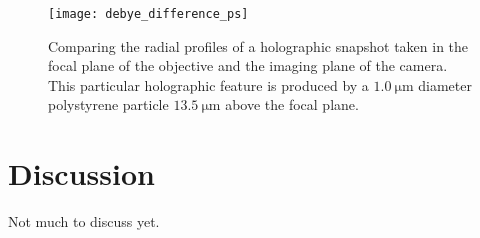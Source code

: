 \begin{figure}
  \centering
  \texttt{[image: debye\_difference\_ps]}
  \caption{Comparing the radial profiles of a holographic snapshot taken
    in the focal plane of the objective and the imaging plane of the camera.
    This particular holographic feature is produced by a $\SI{1.0}{\um}$
    diameter polystyrene particle $\SI{13.5}{\um}$ above the focal plane.}
  \label{fig:debye_difference_ps}
\end{figure}


\section{Discussion}

Not much to discuss yet.


